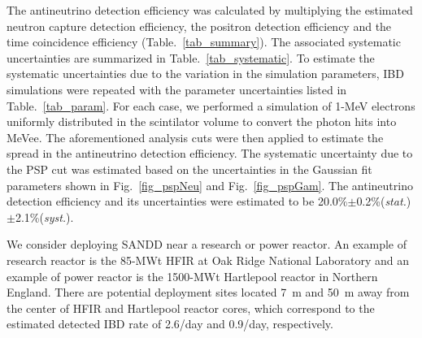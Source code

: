 \documentclass[final,5p,times,twocolumn]{elsarticle}
\begin{document}
The antineutrino detection efficiency was calculated by multiplying the estimated neutron capture detection efficiency, the positron detection efficiency and the time coincidence efficiency (Table.~\ref{tab_summary}). 
The associated systematic uncertainties are summarized in Table.~\ref{tab_systematic}. 
To estimate the systematic uncertainties due to the variation in the simulation parameters, IBD simulations were repeated with the parameter uncertainties listed in Table.~\ref{tab_param}. For each case, we performed a simulation of 1-MeV electrons uniformly distributed in the scintilator volume to convert the photon hits into MeVee. The aforementioned analysis cuts were then applied to estimate the spread in the antineutrino detection efficiency. 
The systematic uncertainty due to the PSP cut was estimated based on the uncertainties in the Gaussian fit parameters shown in Fig.~\ref{fig_pspNeu} and Fig.~\ref{fig_pspGam}.
The antineutrino detection efficiency and its uncertainties were estimated to be 20.0\%$\pm$0.2\%(\textit{stat.})$\pm$2.1\%(\textit{syst.}).

We consider deploying SANDD near a research or power reactor.
An example of research reactor is the 85-MWt HFIR at Oak Ridge National Laboratory and an example of power reactor is the 1500-MWt Hartlepool reactor in Northern England. There are potential deployment sites located 7~m and 50~m away from the center of HFIR and Hartlepool reactor cores, which correspond to the estimated detected IBD rate of 2.6/day and 0.9/day, respectively. 


 
\end{document}
